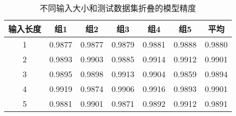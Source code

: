 \begin{table}[ht]
\caption{不同输入大小和测试数据集折叠的模型精度
}
\label{tab:check_cross}
\centering
\begin{tabular}{c|c|c|c|c|c|c}
        \toprule[1.5pt]
        输入长度  & 组1 & 组2 & 组3 & 组4 & 组5 & 平均 \\
      \midrule[0.8pt]
        1  & 0.9877 &	0.9877 &	0.9879 &	0.9881 &	0.9888 &	0.9880 \\
        
        2  & 0.9893 &	0.9903& 	0.9885 &	0.9914 &	0.9912& 	0.9901  \\
        
         3  & 0.9895 &	0.9898& 	0.9913 &	0.9904 &	0.9859 &	0.9894  \\
        
        4  & 0.9919 &	0.9874& 	0.9906& 	0.9916 &	0.9893 &	0.9901  \\
        
        5  & 0.9881 &	0.9901 &	0.9871 &	0.9892& 	0.9912 &	0.9891 \\
        \bottomrule[1.5pt]
\end{tabular}
\end{table}